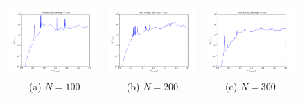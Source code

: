 \documentclass{article}
\begin{document}
\begin{multicols}{2}
\begin{figure}
\begin{center}
\begin{tabular}{ccc}
  	\includegraphics[width=60mm]{Images/Ek_100stars.png}
	& \includegraphics[width=60mm]{Images/Ek_200stars.png}
	& \includegraphics[width=60mm]{Images/Ek_300stars.png} \\
	(a) $N = 100$		& (b) $N = 200$  	& (c) $N = 300$ \\[6pt]
	

\end{tabular}
\end{center}
\end{figure}
\end{multicols}
\end{document}
